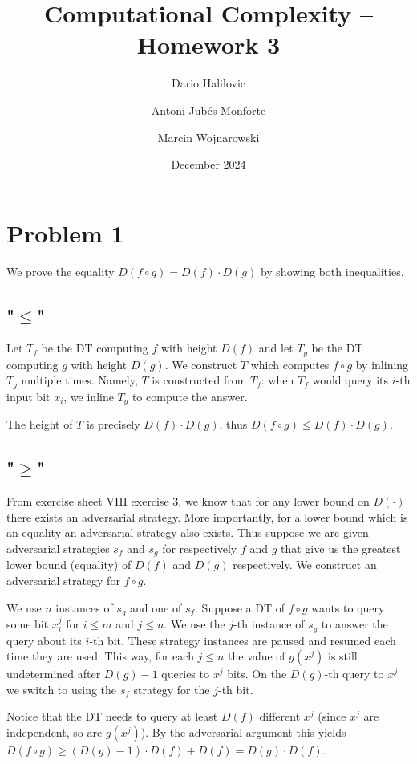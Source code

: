 \documentclass{article}
\title{Computational Complexity -- Homework 3}
\author{Dario Halilovic\and
Antoni Jubés Monforte\and
Marcin Wojnarowski}
\date{December 2024}
\begin{document}
\maketitle

\section*{Problem 1}

We prove the equality $D(f \circ g) = D(f) \cdot D(g)$ by showing both inequalities.

\subsection*{"$\le$"}

Let $T_f$ be the DT computing $f$ with height $D(f)$ and let $T_g$ be the DT computing $g$ with height $D(g)$. We construct $T$ which computes $f \circ g$ by inlining $T_g$ multiple times. Namely, $T$ is constructed from $T_f$: when $T_f$ would query its $i$-th input bit $x_i$, we inline $T_g$ to compute the answer.

The height of $T$ is precisely $D(f) \cdot D(g)$, thus $D(f \circ g) \le D(f) \cdot D(g)$.

\subsection*{"$\ge$"}

From exercise sheet VIII exercise 3, we know that for any lower bound on $D(\cdot)$ there exists an adversarial strategy. More importantly, for a lower bound which is an equality an adversarial strategy also exists. Thus suppose we are given adversarial strategies $s_f$ and $s_g$ for respectively $f$ and $g$ that give us the greatest lower bound (equality) of $D(f)$ and $D(g)$ respectively. We construct an adversarial strategy for $f \circ g$.

We use $n$ instances of $s_g$ and one of $s_f$. Suppose a DT of $f \circ g$ wants to query some bit $x_i^j$ for $i \le m$ and $j \le n$. We use the $j$-th instance of $s_g$ to answer the query about its $i$-th bit. These strategy instances are paused and resumed each time they are used. This way, for each $j \le n$ the value of $g(x^j)$ is still undetermined after $D(g)-1$ queries to $x^j$ bits. On the $D(g)$-th query to $x^j$ we switch to using the $s_f$ strategy for the $j$-th bit.

Notice that the DT needs to query at least $D(f)$ different $x^j$ (since $x^j$ are independent, so are $g(x^j)$). By the adversarial argument this yields $D(f \circ g) \ge (D(g) - 1) \cdot D(f) + D(f) = D(g) \cdot D(f)$.
\end{document}
